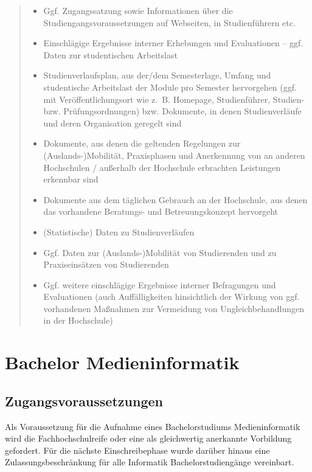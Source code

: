 \begin{quote}
\begin{itemize}
\item
  Ggf. Zugangssatzung sowie Informationen über die
  Studiengangsvoraussetzungen auf Webseiten, in Studienführern etc.
\item
  Einschlägige Ergebnisse interner Erhebungen und Evaluationen -- ggf.
  Daten zur studentischen Arbeitslast
\item
  Studienverlaufsplan, aus der/dem Semesterlage, Umfang und studentische
  Arbeitslast der Module pro Semester hervorgehen (ggf. mit
  Veröffentlichungsort wie z.~B. Homepage, Studienführer, Studien- bzw.
  Prüfungsordnungen) bzw. Dokumente, in denen Studienverläufe und deren
  Organisation geregelt sind
\item
  Dokumente, aus denen die geltenden Regelungen zur
  (Auslands-)Mobilität, Praxisphasen und Anerkennung von an anderen
  Hochschulen / außerhalb der Hochschule erbrachten Leistungen erkennbar
  sind
\item
  Dokumente aus dem täglichen Gebrauch an der Hochschule, aus denen das
  vorhandene Beratungs- und Betreuungskonzept hervorgeht
\item
  (Statistische) Daten zu Studienverläufen
\item
  Ggf. Daten zur (Auslands-)Mobilität von Studierenden und zu
  Praxiseinsätzen von Studierenden
\item
  Ggf. weitere einschlägige Ergebnisse interner Befragungen und
  Evaluationen (auch Auffälligkeiten hinsichtlich der Wirkung von ggf.
  vorhandenen Maßnahmen zur Vermeidung von Ungleichbehandlungen in der
  Hochschule)
\end{itemize}
\end{quote}

\section{Bachelor
Medieninformatik}\label{bachelor-medieninformatik-1}

\subsection{Zugangsvoraussetzungen}\label{zugangsvoraussetzungen}

Als Voraussetzung für die Aufnahme eines Bachelorstudiums
Medieninformatik wird die Fachhochschulreife oder eine als gleichwertig
anerkannte Vorbildung gefordert. Für die nächste Einschreibephase wurde
darüber hinaus eine Zulassungsbeschränkung für alle Informatik
Bachelorstudiengänge vereinbart.

